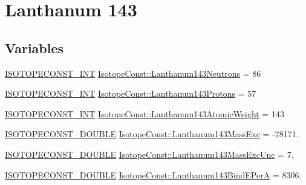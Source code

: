 \hypertarget{group___isotope_const-_lanthanum-_la143}{}\section{Lanthanum 143}
\label{group___isotope_const-_lanthanum-_la143}
\subsection*{Variables}
\begin{DoxyCompactItemize}
\item 
\mbox{\hyperlink{group___isotope_const-_macros_ga5f18360b3e99483a35c32d789e62621c}{I\+S\+O\+T\+O\+P\+E\+C\+O\+N\+S\+T\+\_\+\+I\+NT}} \mbox{\hyperlink{group___isotope_const-_lanthanum-_la143_ga2eb59a389488081e4fec46adb087b927}{Isotope\+Const\+::\+Lanthanum143\+Neutrons}} = 86
\item 
\mbox{\hyperlink{group___isotope_const-_macros_ga5f18360b3e99483a35c32d789e62621c}{I\+S\+O\+T\+O\+P\+E\+C\+O\+N\+S\+T\+\_\+\+I\+NT}} \mbox{\hyperlink{group___isotope_const-_lanthanum-_la143_ga9ef3306a039b4b6a98c0d0f2dcf8eef3}{Isotope\+Const\+::\+Lanthanum143\+Protons}} = 57
\item 
\mbox{\hyperlink{group___isotope_const-_macros_ga5f18360b3e99483a35c32d789e62621c}{I\+S\+O\+T\+O\+P\+E\+C\+O\+N\+S\+T\+\_\+\+I\+NT}} \mbox{\hyperlink{group___isotope_const-_lanthanum-_la143_ga065070e4a3d53e246ae64c79d2f32d63}{Isotope\+Const\+::\+Lanthanum143\+Atomic\+Weight}} = 143
\item 
\mbox{\hyperlink{group___isotope_const-_macros_ga8f45a7272ce02c0b4c65c44636ed719a}{I\+S\+O\+T\+O\+P\+E\+C\+O\+N\+S\+T\+\_\+\+D\+O\+U\+B\+LE}} \mbox{\hyperlink{group___isotope_const-_lanthanum-_la143_gad844c071ea10fefeed058aa4b1436223}{Isotope\+Const\+::\+Lanthanum143\+Mass\+Exc}} = -\/78171.
\item 
\mbox{\hyperlink{group___isotope_const-_macros_ga8f45a7272ce02c0b4c65c44636ed719a}{I\+S\+O\+T\+O\+P\+E\+C\+O\+N\+S\+T\+\_\+\+D\+O\+U\+B\+LE}} \mbox{\hyperlink{group___isotope_const-_lanthanum-_la143_gaf193cbbc7fa55af423bbb8a98a7ef1cd}{Isotope\+Const\+::\+Lanthanum143\+Mass\+Exc\+Unc}} = 7.
\item 
\mbox{\hyperlink{group___isotope_const-_macros_ga8f45a7272ce02c0b4c65c44636ed719a}{I\+S\+O\+T\+O\+P\+E\+C\+O\+N\+S\+T\+\_\+\+D\+O\+U\+B\+LE}} \mbox{\hyperlink{group___isotope_const-_lanthanum-_la143_gad76877c8351d48112690c8705799e0bf}{Isotope\+Const\+::\+Lanthanum143\+Bind\+E\+PerA}} = 8306.
\item 

\end{DoxyCompactItemize}
